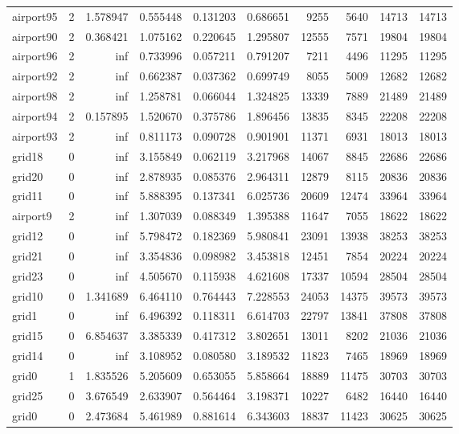 \begin{longtable}{|l|r|r|r|r|r|r|r|r|r|}
airport95 & 2 & 1.578947 & 0.555448 & 0.131203 & 0.686651 & 9255 & 5640 & 14713 & 14713 \\
airport90 & 2 & 0.368421 & 1.075162 & 0.220645 & 1.295807 & 12555 & 7571 & 19804 & 19804 \\
airport96 & 2 & inf & 0.733996 & 0.057211 & 0.791207 & 7211 & 4496 & 11295 & 11295 \\
airport92 & 2 & inf & 0.662387 & 0.037362 & 0.699749 & 8055 & 5009 & 12682 & 12682 \\
airport98 & 2 & inf & 1.258781 & 0.066044 & 1.324825 & 13339 & 7889 & 21489 & 21489 \\
airport94 & 2 & 0.157895 & 1.520670 & 0.375786 & 1.896456 & 13835 & 8345 & 22208 & 22208 \\
airport93 & 2 & inf & 0.811173 & 0.090728 & 0.901901 & 11371 & 6931 & 18013 & 18013 \\
grid18 & 0 & inf & 3.155849 & 0.062119 & 3.217968 & 14067 & 8845 & 22686 & 22686 \\
grid20 & 0 & inf & 2.878935 & 0.085376 & 2.964311 & 12879 & 8115 & 20836 & 20836 \\
grid11 & 0 & inf & 5.888395 & 0.137341 & 6.025736 & 20609 & 12474 & 33964 & 33964 \\
airport9 & 2 & inf & 1.307039 & 0.088349 & 1.395388 & 11647 & 7055 & 18622 & 18622 \\
grid12 & 0 & inf & 5.798472 & 0.182369 & 5.980841 & 23091 & 13938 & 38253 & 38253 \\
grid21 & 0 & inf & 3.354836 & 0.098982 & 3.453818 & 12451 & 7854 & 20224 & 20224 \\
grid23 & 0 & inf & 4.505670 & 0.115938 & 4.621608 & 17337 & 10594 & 28504 & 28504 \\
grid10 & 0 & 1.341689 & 6.464110 & 0.764443 & 7.228553 & 24053 & 14375 & 39573 & 39573 \\
grid1 & 0 & inf & 6.496392 & 0.118311 & 6.614703 & 22797 & 13841 & 37808 & 37808 \\
grid15 & 0 & 6.854637 & 3.385339 & 0.417312 & 3.802651 & 13011 & 8202 & 21036 & 21036 \\
grid14 & 0 & inf & 3.108952 & 0.080580 & 3.189532 & 11823 & 7465 & 18969 & 18969 \\
grid0 & 1 & 1.835526 & 5.205609 & 0.653055 & 5.858664 & 18889 & 11475 & 30703 & 30703 \\
grid25 & 0 & 3.676549 & 2.633907 & 0.564464 & 3.198371 & 10227 & 6482 & 16440 & 16440 \\
grid0 & 0 & 2.473684 & 5.461989 & 0.881614 & 6.343603 & 18837 & 11423 & 30625 & 30625 \\

\end{longtable}
